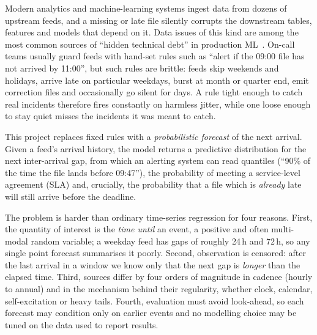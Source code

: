 \documentclass[10pt,twocolumn]{article}
\makeatletter
\renewcommand\section{\@startsection{section}{1}{\z@}{-2.2ex plus -0.5ex minus -0.2ex}{1.0ex plus 0.2ex}{\normalfont\Large\bfseries}}
\makeatother
\begin{document}
\section{Introduction}
Modern analytics and machine-learning systems ingest data from dozens of upstream feeds, and a
missing or late file silently corrupts the downstream tables, features and models that depend on it.
Data issues of this kind are among the most common sources of ``hidden technical debt'' in
production ML~\citep{sculley2015hidden,schelter2018automating}. On-call teams usually guard feeds
with hand-set rules such as ``alert if the 09:00 file has not arrived by 11:00'', but such rules are
brittle: feeds skip weekends and holidays, arrive late on particular weekdays, burst at month or
quarter end, emit correction files and occasionally go silent for days. A rule tight enough to catch
real incidents therefore fires constantly on harmless jitter, while one loose enough to stay quiet
misses the incidents it was meant to catch.

This project replaces fixed rules with a \emph{probabilistic forecast} of the next arrival. Given a
feed's arrival history, the model returns a predictive distribution for the next inter-arrival gap,
from which an alerting system can read quantiles (``90\% of the time the file lands before 09:47''),
the probability of meeting a service-level agreement (SLA) and, crucially, the probability that a
file which is \emph{already} late will still arrive before the deadline.

The problem is harder than ordinary time-series regression for four reasons. First, the quantity of
interest is the \emph{time until} an event, a positive and often multi-modal random variable; a
weekday feed has gaps of roughly 24\,h and 72\,h, so any single point forecast summarises it poorly.
Second, observation is censored: after the last arrival in a window we know only that the next gap
is \emph{longer} than the elapsed time. Third, sources differ by four orders of magnitude in cadence
(hourly to annual) and in the mechanism behind their regularity, whether clock, calendar,
self-excitation or heavy tails. Fourth, evaluation must avoid look-ahead, so each forecast may
condition only on earlier events and no modelling choice may be tuned on the data used to report
results.
\end{document}
